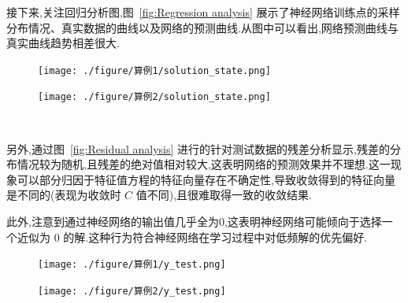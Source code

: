 \documentclass{Sichuan Normal University}
\begin{document}
    接下来,关注回归分析图,图~\ref{fig:Regression analysis} 展示了神经网络训练点的采样分布情况、真实数据的曲线以及网络的预测曲线.从图中可以看出,网络预测曲线与真实曲线趋势相差很大.
\begin{figure}[H]
    \centering
    \begin{minipage}[c]{0.48\textwidth}
    \centering
    \texttt{[image: ./figure/算例1/solution\_state.png]}
    \end{minipage}
    \hspace{0.02\textwidth}
    \begin{minipage}[c]{0.48\textwidth}
    \centering
    \texttt{[image: ./figure/算例2/solution\_state.png]}
    \end{minipage}\\[3mm]
    \begin{minipage}[t]{0.48\textwidth}
    \centering
    \label{fig:Regression analysis}
    \end{minipage}
    \hspace{0.02\textwidth}
    \begin{minipage}[t]{0.48\textwidth}
    \centering
    \label{fig:Regression analysis2}
    \end{minipage}
    \end{figure}
    另外,通过图~\ref{fig:Residual analysis} 进行的针对测试数据的残差分析显示,残差的分布情况较为随机,且残差的绝对值相对较大,这表明网络的预测效果并不理想.这一现象可以部分归因于特征值方程的特征向量存在不确定性,导致收敛得到的特征向量是不同的(表现为收敛时 $C$ 值不同),且很难取得一致的收敛结果.

    此外,注意到通过神经网络的输出值几乎全为$0$,这表明神经网络可能倾向于选择一个近似为 $0$ 的解.这种行为符合神经网络在学习过程中对低频解的优先偏好.
\begin{figure}[H]
    \centering
    \begin{minipage}[c]{0.48\textwidth}
    \centering
    \texttt{[image: ./figure/算例1/y\_test.png]}
    \end{minipage}
    \hspace{0.02\textwidth}
    \begin{minipage}[c]{0.48\textwidth}
    \centering
    \texttt{[image: ./figure/算例2/y\_test.png]}
    \end{minipage}\\[3mm]
    \begin{minipage}[t]{0.48\textwidth}
    \centering
    \label{fig:Residual analysis}
    \end{minipage}
    \hspace{0.02\textwidth}
    \begin{minipage}[t]{0.48\textwidth}
    \centering
    \label{fig:Residual analysis2}
    \end{minipage}
    \end{figure}
\end{document}
